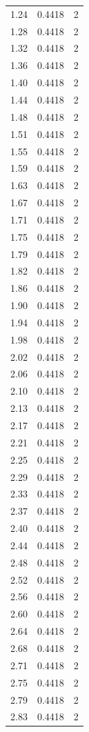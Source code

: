 \begin{longtable}{lrr}
  1.24 & 0.4418 & 2 \\
  1.28 & 0.4418 & 2 \\
  1.32 & 0.4418 & 2 \\
  1.36 & 0.4418 & 2 \\
  1.40 & 0.4418 & 2 \\
  1.44 & 0.4418 & 2 \\
  1.48 & 0.4418 & 2 \\
  1.51 & 0.4418 & 2 \\
  1.55 & 0.4418 & 2 \\
  1.59 & 0.4418 & 2 \\
  1.63 & 0.4418 & 2 \\
  1.67 & 0.4418 & 2 \\
  1.71 & 0.4418 & 2 \\
  1.75 & 0.4418 & 2 \\
  1.79 & 0.4418 & 2 \\
  1.82 & 0.4418 & 2 \\
  1.86 & 0.4418 & 2 \\
  1.90 & 0.4418 & 2 \\
  1.94 & 0.4418 & 2 \\
  1.98 & 0.4418 & 2 \\
  2.02 & 0.4418 & 2 \\
  2.06 & 0.4418 & 2 \\
  2.10 & 0.4418 & 2 \\
  2.13 & 0.4418 & 2 \\
  2.17 & 0.4418 & 2 \\
  2.21 & 0.4418 & 2 \\
  2.25 & 0.4418 & 2 \\
  2.29 & 0.4418 & 2 \\
  2.33 & 0.4418 & 2 \\
  2.37 & 0.4418 & 2 \\
  2.40 & 0.4418 & 2 \\
  2.44 & 0.4418 & 2 \\
  2.48 & 0.4418 & 2 \\
  2.52 & 0.4418 & 2 \\
  2.56 & 0.4418 & 2 \\
  2.60 & 0.4418 & 2 \\
  2.64 & 0.4418 & 2 \\
  2.68 & 0.4418 & 2 \\
  2.71 & 0.4418 & 2 \\
  2.75 & 0.4418 & 2 \\
  2.79 & 0.4418 & 2 \\
  2.83 & 0.4418 & 2 \\

\end{longtable}
